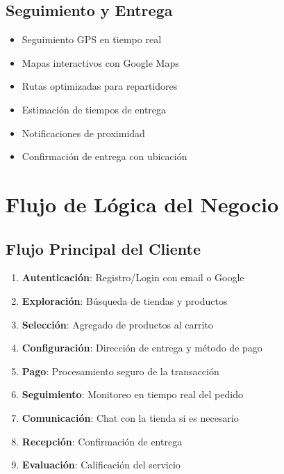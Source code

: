 \documentclass[12pt,a4paper]{article}
\begin{document}
\subsection{Seguimiento y Entrega}
\begin{itemize}[itemsep=0.5em]
    \item Seguimiento GPS en tiempo real
    \item Mapas interactivos con Google Maps
    \item Rutas optimizadas para repartidores
    \item Estimación de tiempos de entrega
    \item Notificaciones de proximidad
    \item Confirmación de entrega con ubicación
\end{itemize}

\section{Flujo de Lógica del Negocio}

\subsection{Flujo Principal del Cliente}
\begin{enumerate}[label=\arabic*.]
    \item \textbf{Autenticación}: Registro/Login con email o Google
    \item \textbf{Exploración}: Búsqueda de tiendas y productos
    \item \textbf{Selección}: Agregado de productos al carrito
    \item \textbf{Configuración}: Dirección de entrega y método de pago
    \item \textbf{Pago}: Procesamiento seguro de la transacción
    \item \textbf{Seguimiento}: Monitoreo en tiempo real del pedido
    \item \textbf{Comunicación}: Chat con la tienda si es necesario
    \item \textbf{Recepción}: Confirmación de entrega
    \item \textbf{Evaluación}: Calificación del servicio
\end{enumerate}
\end{document}
